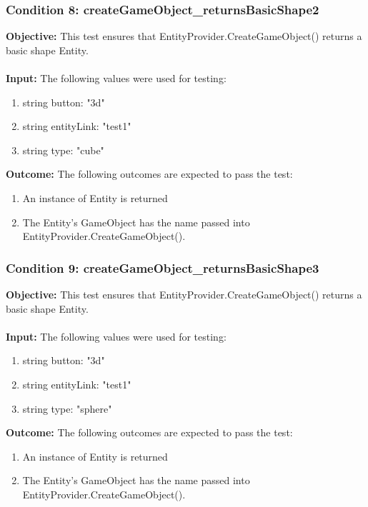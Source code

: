 \documentclass[a4paper,12pt]{article}
\begin{document}
		\subsubsection{Condition 8: createGameObject\_returnsBasicShape2}
			\textbf{Objective:} This test ensures that EntityProvider.CreateGameObject() returns a basic shape Entity.\\\\
			\textbf{Input:} The following values were used for testing:
				\begin{enumerate}
					\item string button: "3d"
					\item string entityLink: "test1"
					\item string type: "cube"
				\end{enumerate}
			\textbf{Outcome:} The following outcomes are expected to pass the test:
				\begin{enumerate}
					\item An instance of Entity is returned
					\item The Entity's GameObject has the name passed into EntityProvider.CreateGameObject().
				\end{enumerate}

		\subsubsection{Condition 9: createGameObject\_returnsBasicShape3}
			\textbf{Objective:} This test ensures that EntityProvider.CreateGameObject() returns a basic shape Entity.\\\\
			\textbf{Input:} The following values were used for testing:
				\begin{enumerate}
					\item string button: "3d"
					\item string entityLink: "test1"
					\item string type: "sphere"
				\end{enumerate}
			\textbf{Outcome:} The following outcomes are expected to pass the test:
				\begin{enumerate}
					\item An instance of Entity is returned
					\item The Entity's GameObject has the name passed into EntityProvider.CreateGameObject().
				\end{enumerate}
\end{document}
